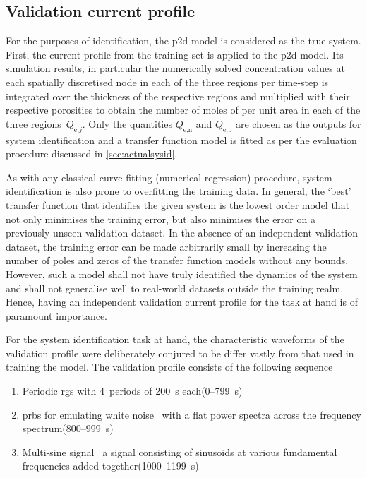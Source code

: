 \subsection{Validation current profile}

For the  purposes of identification,  the \gls{p2d}  model is considered  as the
true system. First, the current profile from  the training set is applied to the
\gls{p2d} model.  Its simulation results,  in particular the  numerically solved
concentration values  at each spatially  discretised node  in each of  the three
regions per time-step is integrated over the thickness of the respective regions
and multiplied with their respective porosities to obtain the number of moles of
 per unit area in each  of the three regions~$Q_{\text{e,}j}$. Only the
quantities  $Q_\text{e,n}$ and  $Q_\text{e,p}$  are chosen  as  the outputs  for
system  identification and  a  transfer  function model  is  fitted  as per  the
evaluation procedure discussed in \cref{sec:actualsysid}.

As with  any classical  curve fitting  (numerical regression)  procedure, system
identification is also  prone to overfitting the training data.  In general, the
`best' transfer  function that identifies the  given system is the  lowest order
model that not  only minimises the training error, but  also minimises the error
on a  previously unseen  validation dataset.  In the  absence of  an independent
validation  dataset,  the  training  error  can be  made  arbitrarily  small  by
increasing the number of poles and zeros of the transfer function models without
any bounds. However,  such a model shall not have  truly identified the dynamics
of the system  and shall not generalise well to  real-world datasets outside the
training realm. Hence, having an  independent validation current profile for the
task at hand is of paramount importance.

For the system identification task at  hand, the characteristic waveforms of the
validation profile were deliberately conjured to be differ vastly from that used
in training the model. The  validation profile consists of the following
sequence
\begin{enumerate}
    \item Periodic \gls{rgs} with 4~periods of \SI{200}{\second} each\quad (0--\SI{799}{\second})
    \item \gls{prbs} for emulating white noise \ie~with a flat power spectra
        across the frequency spectrum\quad (800--\SI{999}{\second})
    \item Multi-sine signal \ie~a signal consisting of sinusoids at
        various fundamental frequencies added together\quad (1000--\SI{1199}{\second})
\end{enumerate}

